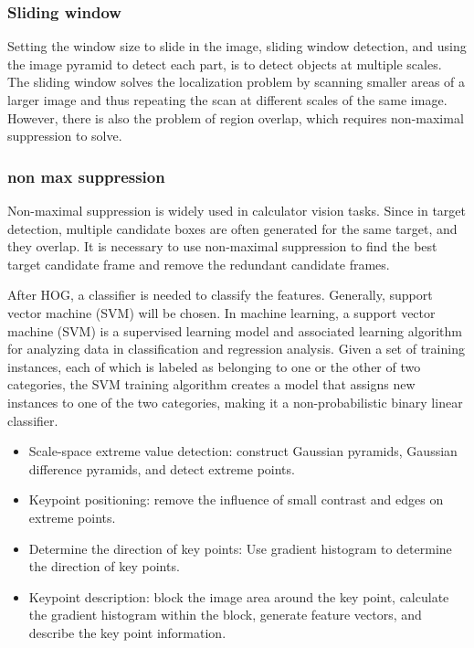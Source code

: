 \documentclass[conference]{IEEEtran}
\begin{document}
\subsubsection{Sliding window}

Setting the window size to slide in the image, sliding window detection, and using the image pyramid to detect each part, is to detect objects at multiple scales. The sliding window solves the localization problem by scanning smaller areas of a larger image and thus repeating the scan at different scales of the same image. However, there is also the problem of region overlap, which requires non-maximal suppression to solve.

\subsubsection{non max suppression}

Non-maximal suppression is widely used in calculator vision tasks. Since in target detection, multiple candidate boxes are often generated for the same target, and they overlap. It is necessary to use non-maximal suppression to find the best target candidate frame and remove the redundant candidate frames.

After HOG, a classifier is needed to classify the features. Generally, support vector machine (SVM) will be chosen.
In machine learning, a support vector machine (SVM) is a supervised learning model and associated learning algorithm for analyzing data in classification and regression analysis. Given a set of training instances, each of which is labeled as belonging to one or the other of two categories, the SVM training algorithm creates a model that assigns new instances to one of the two categories, making it a non-probabilistic binary linear classifier.


\begin{itemize}
\item Scale-space extreme value detection: construct Gaussian pyramids, Gaussian difference pyramids, and detect extreme points.
\item Keypoint positioning: remove the influence of small contrast and edges on extreme points.
\item Determine the direction of key points: Use gradient histogram to determine the direction of key points.
\item Keypoint description: block the image area around the key point, calculate the gradient histogram within the block, generate feature vectors, and describe the key point information.
\end{itemize}
\end{document}

